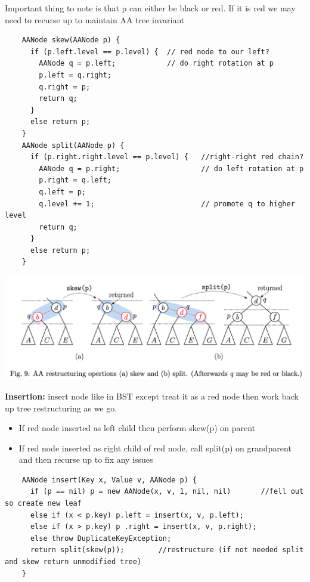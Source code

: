\documentclass{article}
\begin{document}
  Important thing to note is that p can either be black or red. If it is red we may need to recurse up to maintain AA tree invariant
  \begin{lstlisting}
    AANode skew(AANode p) {   
      if (p.left.level == p.level) {  // red node to our left?
        AANode q = p.left;            // do right rotation at p
        p.left = q.right;
        q.right = p;
        return q;
      }
      else return p;
    }
    AANode split(AANode p) {
      if (p.right.right.level == p.level) {   //right-right red chain?
        AANode q = p.right;                   // do left rotation at p
        p.right = q.left;
        q.left = p;
        q.level += 1;                         // promote q to higher level
        return q;
      }
      else return p;
    }
  \end{lstlisting}
  \begin{center}
  \includegraphics[scale=0.15]{AASkewSplit}
  \end{center}
  \textbf{Insertion: }insert node like in BST except treat it as a red node then work back up tree restructuring as we go.
  \begin{itemize}[noitemsep]
  \item If red node inserted as left child then perform skew(p) on parent
  \item If red node inserted as right child of red node, call split(p) on grandparent and then recurse up to fix any issues
  \end{itemize}
  \begin{lstlisting}
    AANode insert(Key x, Value v, AANode p) {
      if (p == nil) p = new AANode(x, v, 1, nil, nil)       //fell out so create new leaf
      else if (x < p.key) p.left = insert(x, v, p.left);
      else if (x > p.key) p .right = insert(x, v, p.right);
      else throw DuplicateKeyException;
      return split(skew(p));        //restructure (if not needed split and skew return unmodified tree)
    }
  \end{lstlisting}
\end{document}

